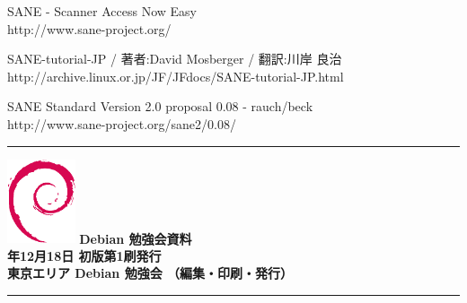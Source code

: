 \documentclass[mingoth,a4paper]{jsarticle}
\newcommand{\debmtgyear}{2010}
\newcommand{\debmtgmonth}{12}
\newcommand{\debmtgdate}{18}
\begin{document}
\begin{thebibliography}{0}
 SANE - Scanner Access Now Easy \\
http://www.sane-project.org/

SANE-tutorial-JP / 著者:David Mosberger / 翻訳:川岸 良治\\
http://archive.linux.or.jp/JF/JFdocs/SANE-tutorial-JP.html

SANE Standard Version 2.0 proposal 0.08 - rauch/beck \\
http://www.sane-project.org/sane2/0.08/

\end{thebibliography}


\printindex

\cleartooddpage

\vspace*{15cm}
\hrule
\vspace{2mm}
\includegraphics[width=2cm]{image200502/openlogo-nd.eps}
\noindent \Large \bf Debian 勉強会資料\\
\noindent \normalfont \debmtgyear{}年\debmtgmonth{}月\debmtgdate{}日 \hspace{5mm}  初版第1刷発行\\
\noindent \normalfont 東京エリア Debian 勉強会 （編集・印刷・発行）\\
\hrule
\end{document}
